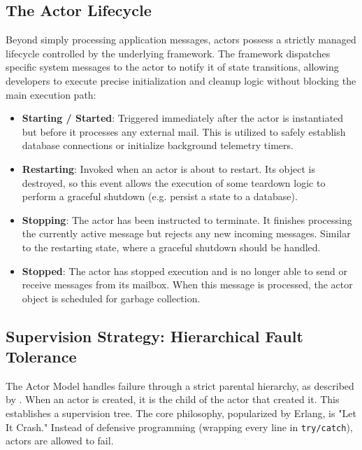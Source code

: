 \subsection{The Actor Lifecycle}

Beyond simply processing application messages, actors possess a strictly managed lifecycle \cite{proto_lifecycle_docs} controlled by the underlying framework. The framework dispatches specific system messages to the actor to notify it of state transitions, allowing developers to execute precise initialization and cleanup logic without blocking the main execution path:

\begin{itemize}
    \item \textbf{Starting / Started}: Triggered immediately after the actor is instantiated but before it processes any external mail. This is utilized to safely establish database connections or initialize background telemetry timers.
    
    \item \textbf{Restarting}: Invoked when an actor is about to restart. Its object is destroyed, so this event allows the execution of some teardown logic to perform a graceful shutdown (e.g. persist a state to a database).

    \item \textbf{Stopping}: The actor has been instructed to terminate. It finishes processing the currently active message but rejects any new incoming messages. Similar to the restarting state, where a graceful shutdown should be handled.

    \item \textbf{Stopped}: The actor has stopped execution and is no longer able to send or receive messages from its mailbox. When this message is processed, the actor object is scheduled for garbage collection.
\end{itemize}

\subsection{Supervision Strategy: Hierarchical Fault Tolerance}

The Actor Model handles failure through a strict parental hierarchy, as described by \cite{actor_supervision}. When an actor is created, it is the child of the actor that created it. This establishes a supervision tree. The core philosophy, popularized by Erlang, is "Let It Crash." Instead of defensive programming (wrapping every line in \verb|try/catch|), actors are allowed to fail.

